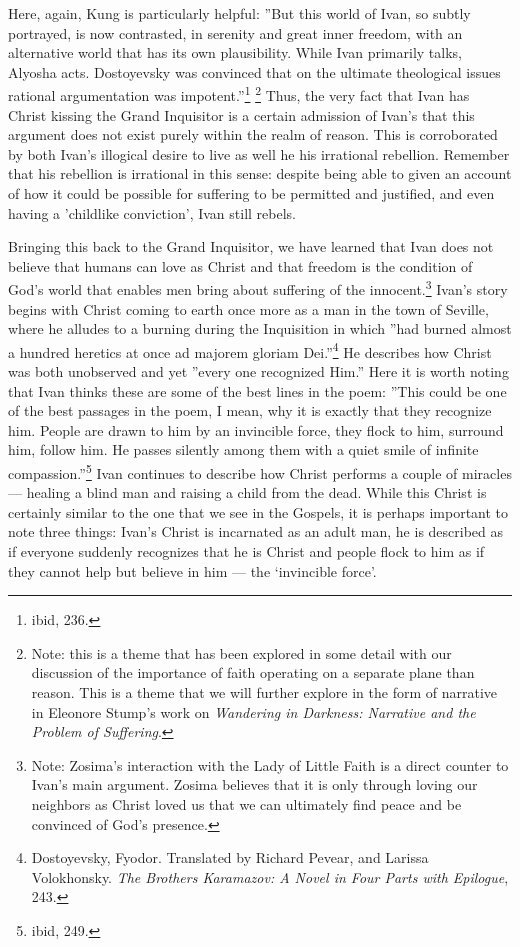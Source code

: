 	Here, again, Kung is particularly helpful: ''But this world of Ivan, so subtly portrayed, is now contrasted, in serenity and great inner freedom, with an alternative world that has its own plausibility. While Ivan primarily talks, Alyosha acts. Dostoyevsky was convinced that on the ultimate theological issues rational argumentation was impotent.''\footnote{ibid, 236.} \footnote{Note: this is a theme that has been explored in some detail with our discussion of the importance of faith operating on a separate plane than reason. This is a theme that we will further explore in the form of narrative in Eleonore Stump's work on \emph{Wandering in Darkness: Narrative and the Problem of Suffering}.} Thus, the very fact that Ivan has Christ kissing the Grand Inquisitor is a certain admission of Ivan's that this argument does not exist purely within the realm of reason. This is corroborated by both Ivan's illogical desire to live as well he his irrational rebellion. Remember that his rebellion is irrational in this sense: despite being able to given an account of how it could be possible for suffering to be permitted and justified, and even having a 'childlike conviction', Ivan still rebels.

	Bringing this back to the Grand Inquisitor, we have learned that Ivan does not believe that humans can love as Christ and that freedom is the condition of God's world that enables men bring about suffering of the innocent.\footnote{Note: Zosima's interaction with the Lady of Little Faith is a direct counter to Ivan's main argument. Zosima believes that it is only through loving our neighbors as Christ loved us that we can ultimately find peace and be convinced of God's presence.} Ivan's story begins with Christ coming to earth once more as a man in the town of Seville, where he alludes to a burning during the Inquisition in which ''had burned almost a hundred heretics at once ad majorem gloriam Dei.''\footnote{Dostoyevsky, Fyodor. Translated by Richard Pevear, and Larissa Volokhonsky. \emph{The Brothers Karamazov: A Novel in Four Parts with Epilogue}, 243.} He describes how Christ was both unobserved and yet ''every one recognized Him.'' Here it is worth noting that Ivan thinks these are some of the best lines in the poem: ''This could be one of the best passages in the poem, I mean, why it is exactly that they recognize him. People are drawn to him by an invincible force, they flock to him, surround him, follow him. He passes silently among them with a quiet smile of infinite compassion.''\footnote{ibid, 249.} Ivan continues to describe how Christ performs a couple of miracles --- healing a blind man and raising a child from the dead. While this Christ is certainly similar to the one that we see in the Gospels, it is perhaps important to note three things: Ivan's Christ is incarnated as an adult man, he is described as if everyone suddenly recognizes that he is Christ and people flock to him as if they cannot help but believe in him --- the `invincible force'.

